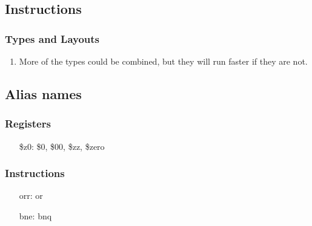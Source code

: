 \documentclass{article}
\begin{document}
	\subsection{Instructions}
		\subsubsection{Types and Layouts}
			\begin{enumerate}
				\item More of the types could be combined, but they will run faster if they are not.
			\end{enumerate}
	\subsection{Alias names}
		\subsubsection{Registers}
			\begin{itemize}
				\item[\$z0:] \$0, \$00, \$zz, \$zero
			\end{itemize}
		\subsubsection{Instructions}
			\begin{itemize}
				\item[orr:] or
				\item[bne:] bnq
			\end{itemize}
\end{document}
